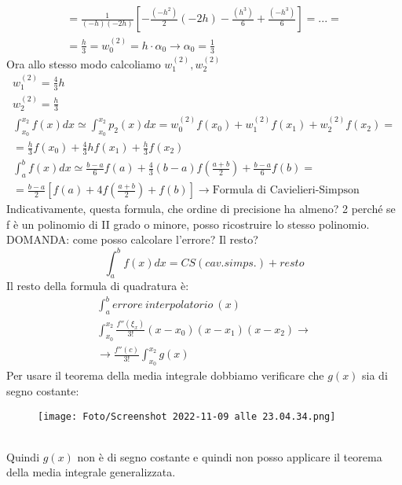 \documentclass[a4paper, portrait]{book}
\numberwithin{equation}{chapter} %
\begin{document}
\begin{gather}
    = \frac{1}{(-h)(-2h)}\left[-\frac{(-h^2)}{2}(-2h)-\frac{(h^3)}{6}+ \frac{(-h^3)}{6}\right] = ... = \\
    = \frac{h}{3} = w_0^{(2)} = h \cdot \alpha_0 \rightarrow \alpha_0 = \frac{1}{3}
\end{gather}
Ora allo stesso modo calcoliamo $w_1^{(2)}, w_2^{(2)}$
\begin{gather}
    w_1^{(2)} = \frac{4}{3} h\\
    w_2^{(2)} = \frac{h}{3}\\
    \int_{x_0}^{x_2} f(x) dx \simeq \int_{x_0}^{x_2}p_2(x) dx = w_0^{(2)}f(x_0) + w_1^{(2)}f(x_1)+w_2^{(2)}f(x_2) = \\
    = \frac{h}{3}f(x_0) + \frac{4}{3}h f(x_1) + \frac{h}{3} f(x_2)\\
    \int_a^b f(x) dx \simeq \frac{b-a}{6} f(a) + \frac{4}{3}(b-a)f(\frac{a+b}{2}) + \frac{b-a}{6}f(b) = \\
    = \frac{b-a}{2}\left[f(a) + 4 f(\frac{a+b}{2}) + f(b)\right] \rightarrow \text{Formula di Cavielieri-Simpson}
\end{gather}
Indicativamente, questa formula, che ordine di precisione ha almeno? 2 perché se f è un polinomio di II grado o minore, posso ricostruire lo stesso polinomio.\\
\newpage
DOMANDA: come posso calcolare l'errore? Il resto?
\begin{equation}
    \int_a^b f(x) dx = CS (cav. simps.) + resto
\end{equation}
Il resto della formula di quadratura è:
\begin{gather}
    \int_a^b errore \ interpolatorio \ (x)\\
    \int_{x_0}^{x_2} \frac{f''(\xi_x)}{3!} (x-x_0)(x-x_1)(x-x_2) \rightarrow\\
    \rightarrow \frac{f''(c)}{3!} \int_{x_0}^{x_2}g(x)
\end{gather}
Per usare il teorema della media integrale dobbiamo verificare che $g(x)$ sia di segno costante:
\begin{figure}[h!]
    \centering
    \texttt{[image: Foto/Screenshot 2022-11-09 alle 23.04.34.png]}
    \caption{}
\end{figure}
\\Quindi $g(x)$ non è di segno costante e quindi non posso applicare il teorema della media integrale generalizzata.
\end{document}
